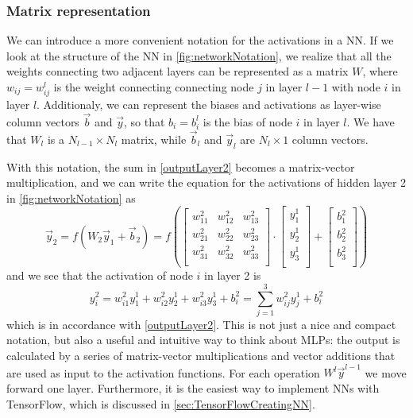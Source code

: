 \documentclass[twoside,english]{uiofysmaster}
\begin{document}
\subsubsection{Matrix representation}
We can introduce a more convenient notation for the activations in a NN. 
If we look at the structure of the NN in \autoref{fig:networkNotation}, we realize that all the weights connecting 
two adjacent layers can be represented as a matrix $W$, where $w_{ij} = w^l_{ij}$ is the weight connecting connecting node $j$
in layer $l-1$ with node $i$ in layer $l$. Additionaly, we can represent the biases and activations
as layer-wise column vectors $\vec{b}$ and $\vec{y}$, so that $b_i = b_i^l$ is the bias of node $i$ in layer $l$. 
We have that $W_l$ is a $N_{l-1} \times N_l$ matrix, while $\vec{b}_l$ and $\vec{y}_l$ are $N_l \times 1$ column vectors. 

With this notation, the sum in \eqref{outputLayer2} becomes a matrix-vector multiplication, and we can write
the equation for the activations of hidden layer 2 in \autoref{fig:networkNotation} as
\begin{equation}
 \vec{y}_2 = f(W_2 \vec{y}_{1} + \vec{b}_{2}) = 
 f\left(\left[\begin{array}{ccc}
    w^2_{11} &w^2_{12} &w^2_{13} \\
    w^2_{21} &w^2_{22} &w^2_{23} \\
    w^2_{31} &w^2_{32} &w^2_{33} \\
    \end{array} \right] \cdot
    \left[\begin{array}{c}
           y^1_1 \\
           y^1_2 \\
           y^1_3 \\
          \end{array}\right] + 
    \left[\begin{array}{c}
           b^2_1 \\
           b^2_2 \\
           b^2_3 \\
          \end{array}\right]\right)
\end{equation}
and we see that the activation of node $i$ in layer 2 is
\begin{equation}
 y^2_i = w^2_{i1}y^1_1 + w^2_{i2}y^1_2 + w^2_{i3}y^1_3 + b^2_i = 
 \sum_{j=1}^3 w^2_{ij} y_j^1 + b^2_i
\end{equation} 
which is in accordance with \eqref{outputLayer2}. This is not just a nice and compact notation, but also 
a useful and intuitive way to think about MLPs: the output is calculated by a series of matrix-vector multiplications
and vector additions that are used as input to the activation functions. For each operation 
$W^l \vec{y}^{l-1}$ we move forward one layer. Furthermore, it is the easiest way to implement NNs with 
TensorFlow, which is discussed in \autoref{sec:TensorFlowCreatingNN}. 
\end{document}
